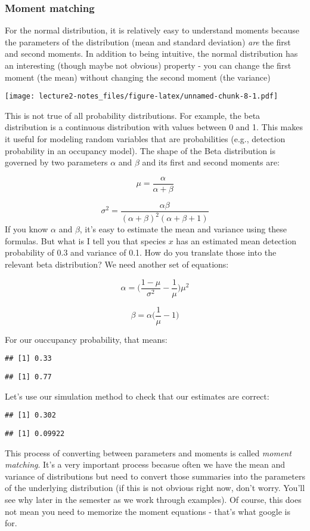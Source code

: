 \documentclass[]{article}
\begin{document}
\hypertarget{moment-matching}{%
\subsubsection{Moment matching}\label{moment-matching}}

For the normal distribution, it is relatively easy to understand moments
because the parameters of the distribution (mean and standard deviation)
\emph{are} the first and second moments. In addition to being intuitive,
the normal distribution has an interesting (though maybe not obvious)
property - you can change the first moment (the mean) without changing
the second moment (the variance)

\texttt{[image: lecture2-notes\_files/figure-latex/unnamed-chunk-8-1.pdf]}

This is not true of all probability distributions. For example, the beta
distribution is a continuous distribution with values between 0 and 1.
This makes it useful for modeling random variables that are
probabilities (e.g., detection probability in an occupancy model). The
shape of the Beta distribution is governed by two parameters \(\alpha\)
and \(\beta\) and its first and second moments are:

\[\mu = \frac{\alpha}{\alpha + \beta}\]

\[\sigma^2 = \frac{\alpha\beta}{(\alpha + \beta)^2 (\alpha + \beta + 1)}\]
If you know \(\alpha\) and \(\beta\), it's easy to estimate the mean and
variance using these formulas. But what is I tell you that species \(x\)
has an estimated mean detection probability of 0.3 and variance of 0.1.
How do you translate those into the relevant beta distribution? We need
another set of equations:

\[\alpha = \bigg(\frac{1-\mu}{\sigma^2}- \frac{1}{\mu} \bigg)\mu^2\]

\[\beta = \alpha \bigg(\frac{1}{\mu}-1\bigg)\]

For our ouccupancy probability, that means:

\begin{verbatim}
## [1] 0.33
\end{verbatim}

\begin{verbatim}
## [1] 0.77
\end{verbatim}

Let's use our simulation method to check that our estimates are correct:

\begin{verbatim}
## [1] 0.302
\end{verbatim}

\begin{verbatim}
## [1] 0.09922
\end{verbatim}

This process of converting between parameters and moments is called
\emph{moment matching}. It's a very important process becasue often we
have the mean and variance of distributions but need to convert those
summaries into the parameters of the underlying distribution (if this is
not obvious right now, don't worry. You'll see why later in the semester
as we work through examples). Of course, this does not mean you need to
memorize the moment equations - that's what google is for.
\end{document}
